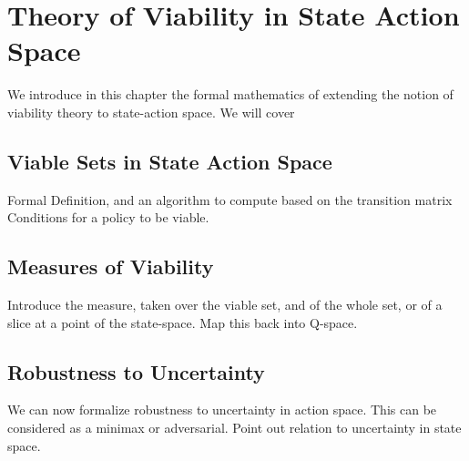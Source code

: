 
\chapter{Theory of Viability in State Action Space}
We introduce in this chapter the formal mathematics of extending the notion of viability theory to state-action space. We will cover

\section{Viable Sets in State Action Space}
Formal Definition, and an algorithm to compute based on the transition matrix
Conditions for a policy to be viable.
\section{Measures of Viability}
Introduce the measure, taken over the viable set, and of the whole set, or of a slice at a point of the state-space. Map this back into Q-space.

\section{Robustness to Uncertainty}
We can now formalize robustness to uncertainty in action space. This can be considered as a minimax or adversarial.
Point out relation to uncertainty in state space.
